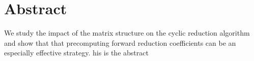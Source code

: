 \chapter*{Abstract}

We study the impact of the matrix structure on
the cyclic reduction algorithm
and show that that precomputing
forward reduction coefficients can be
an especially effective strategy.
his is the abstract
